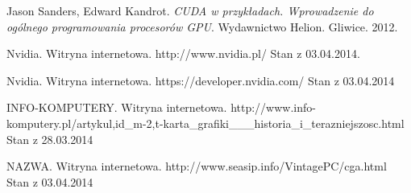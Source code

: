 \begin{thebibliography}{9}
 
	Jason Sanders, Edward Kandrot.
	\emph{CUDA w przykładach. Wprowadzenie do ogólnego programowania procesorów GPU}.
	Wydawnictwo Helion.
	Gliwice.
	2012.
	
	Nvidia.
	Witryna internetowa.
	http://www.nvidia.pl/
	Stan z 03.04.2014.

	Nvidia.
	Witryna internetowa.
	https://developer.nvidia.com/
	Stan z 03.04.2014
	
	INFO-KOMPUTERY.
	Witryna internetowa.
	http://www.info-komputery.pl/artykul,id\_m-2,t-karta\_grafiki\_\_\_historia\_i\_terazniejszosc.html
	Stan z 28.03.2014	

	NAZWA.
	Witryna internetowa.
	http://www.seasip.info/VintagePC/cga.html
	Stan z 03.04.2014

\end{thebibliography}